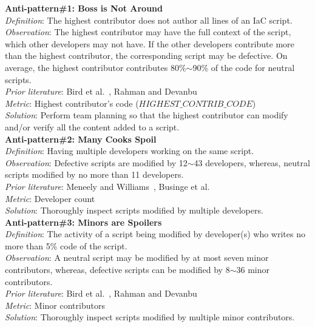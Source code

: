 \documentclass[smallextended]{svjour3}       %
\begin{document}
\begin{shaded}

\hspace{-0.65cm} \textbf{Anti-pattern\#1: Boss is Not Around} \\
\textit{Definition}: The highest contributor does not author all lines of an IaC script. \\ 
\textit{Observation}: The highest contributor may have the full context of the script, which other developers may not have. If the other developers contribute more than the highest contributor, the corresponding script may be defective. On average, the highest contributor contributes 80\%$\mathtt{\sim}$90\% of the code for neutral scripts.   \\
\textit{Prior literature}: Bird et al.~\citep{Bird:Minor}, Rahman and Devanbu~\citep{Rahman:2013:ProcessBetter} \\
\textit{Metric}: Highest contributor's code ($HIGHEST\_CONTRIB\_CODE$)\\
\textit{Solution}: Perform team planning so that the highest contributor can modify and/or verify all the content added to a script. \\

\hspace{-0.65cm}\textbf{Anti-pattern\#2: Many Cooks Spoil}  \\
\textit{Definition}: Having multiple developers working on the same script.\\ 
\textit{Observation}: Defective scripts are modified by 12$\mathtt{\sim}$43 developers, whereas, neutral scripts modified by no more than 11 developers. \\
\textit{Prior literature}: Meneely and Williams~\citep{Meneely:Linus}, Businge et al.~\citep{Foutse:Devs:Android}  \\
\textit{Metric}: Developer count \\
\textit{Solution}: Thoroughly inspect scripts modified by multiple developers. \\

\hspace{-0.65cm}\textbf{Anti-pattern\#3: Minors are Spoilers} \\
\textit{Definition}: The activity of a script being modified by developer(s) who writes no more than 5\% code of the script. \\ 
\textit{Observation}: A neutral script may be modified by at most seven minor contributors, whereas, defective scripts can be modified by 8$\mathtt{\sim}$36 minor contributors. \\
\textit{Prior literature}: Bird et al.~\citep{Bird:Minor}, Rahman and Devanbu~\citep{Rahman:2013:ProcessBetter} \\
\textit{Metric}: Minor contributors \\
\textit{Solution}: Thoroughly inspect scripts modified by multiple minor contributors.  \\


\end{shaded}
\end{document}
